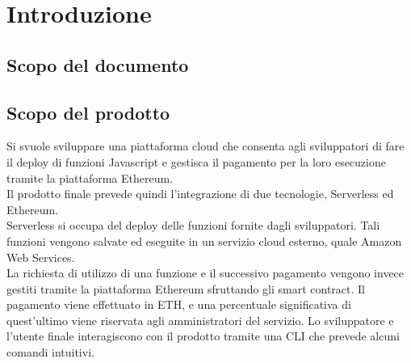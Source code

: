 \section{Introduzione}
\subsection{Scopo del documento}

\subsection{Scopo del prodotto}
	Si svuole sviluppare una piattaforma cloud che consenta agli sviluppatori di fare il deploy di funzioni Javascript e gestisca il pagamento per la loro esecuzione tramite la piattaforma Ethereum.\\
	Il prodotto finale prevede quindi l'integrazione di due tecnologie, Serverless ed Ethereum.\\
	Serverless si occupa del deploy delle funzioni fornite dagli sviluppatori. Tali funzioni vengono salvate ed eseguite in un servizio cloud esterno, quale Amazon Web Services.  \\La richiesta di utilizzo di una funzione e il successivo pagamento vengono invece gestiti tramite la piattaforma Ethereum sfruttando gli smart contract. Il pagamento viene effettuato in ETH, e una percentuale significativa di quest'ultimo viene riservata agli amministratori del servizio. 
	Lo sviluppatore e l'utente finale interagiscono con il prodotto tramite una CLI che prevede alcuni comandi intuitivi.

